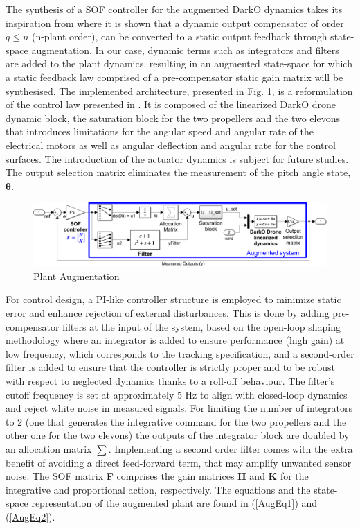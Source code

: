 The synthesis of a SOF controller for the  augmented DarkO dynamics takes its inspiration from \cite{SYRMOS1997125} where it is shown that a dynamic output compensator of order $q \leq n$ (n-plant order), can be converted to a static output feedback through state-space augmentation. In our case, dynamic terms such as integrators and filters are added to the plant dynamics, resulting in an augmented state-space for which a static feedback law comprised of a pre-compensator static gain matrix will be synthesised. The implemented architecture, presented in Fig. \ref{Plant Augmentation}, is a reformulation of the control law presented in \cite{SANSOUACA}. It is composed of the linearized DarkO drone dynamic block, the saturation block for the two propellers and the two elevons that introduces limitations for the angular speed and angular rate of the electrical motors as well as angular deflection and angular rate for the control surfaces. The introduction of the actuator dynamics is subject for future studies. The output selection matrix eliminates the measurement of the pitch angle state, $\boldsymbol\theta$.

\vspace{-0.1cm}

\begin{figure}[hbt]
    \centering
    \includegraphics[width=0.9\columnwidth]{figures/AugWindFinal.png}
    \vspace{-0.3cm}\caption{Plant Augmentation}
    \label{Plant Augmentation}
\end{figure}

For control design, a PI-like controller structure is employed to minimize static error and enhance rejection of external disturbances. This is done by adding pre-compensator filters at the input of the system, based on the open-loop shaping methodology \cite{McFarlane1992} where an integrator is added to ensure performance (high gain) at low frequency, which corresponds to the tracking specification, and a second-order filter is added to ensure that the controller is strictly proper and to be robust with respect to neglected dynamics thanks to a roll-off behaviour. The filter's cutoff frequency is set at approximately 5 Hz to align with closed-loop dynamics and reject white noise in measured signals. For limiting the number of integrators to 2 (one that generates the integrative command for the two propellers and the other one for the two elevons) the outputs of the integrator block are doubled by an allocation matrix $ \sum $. Implementing a second order filter comes with the extra benefit of avoiding a direct feed-forward term, that may amplify unwanted sensor noise. The SOF matrix \textbf{F} comprises the gain matrices \textbf{H} and \textbf{K} for the integrative and proportional action, respectively. The equations and the state-space representation of the augmented plant are found in (\ref{AugEq1}) and (\ref{AugEq2}).

